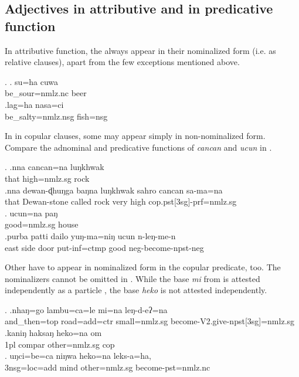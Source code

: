 	
\subsection{Adjectives in attributive and in predicative function}\label{sec-adj-str}

In attributive function, the  always appear in their nominalized form (i.e. as relative clauses), apart from  the few exceptions mentioned above. 

\ex. \ag. su=ha cuwa\\
	be\_sour{\sc =nmlz.nc} beer\\
\bg.lag=ha nasa=ci\\
		be\_salty{\sc =nmlz.nsg} fish{\sc =nsg}	\\
	
In  in copular clauses, some  may appear simply in non-nominalized  form. Compare the adnominal and predicative functions of \emph{cancan}  and  \emph{ucun}  in \Next. 

\ex. \ag.nna   cancan=na luŋkhwak\\
		that high{\sc =nmlz.sg} rock	\\
	 
 	\bg.nna  dewan-ɖhuŋga baŋna luŋkhwak sahro cancan sa-ma=na\\
	that Dewan-stone called rock very high {\sc cop.pst[3sg]-prf=nmlz.sg}	\\
	 
\bg. ucun=na paŋ\\ 
	good{\sc =nmlz.sg} house\\ 
	 \bg.purba patti dailo yuŋ-ma=niŋ  ucun n-leŋ-me-n\\
	east side door put-{\sc inf=ctmp} good {\sc neg-}become{\sc [3sg]-npst-neg}\\
	 
	
Other  have to appear in nominalized form in the copular predicate, too. The nominalizers  cannot  be omitted in \Next. While the base \emph{mi} from \Next[a] is attested independently as a  particle , the base \emph{heko} is not attested independently.

	\ex. \ag.nhaŋ=go        lambu=ca=le                 mi=na  leŋ-d-eʔ=na\\
	and\_then{\sc =top} road{\sc =add=ctr} small{\sc =nmlz.sg}  become{\sc -V2.give-npst[3sg]=nmlz.sg}\\
	 
	\bg.kaniŋ haksaŋ   heko=na         om\\
	{\sc 1pl} {\sc compar} other{\sc =nmlz.sg} {\sc cop}\\
	 
\bg.  uŋci=be=ca           niŋwa heko=na         leks-a=ha,\\
{\sc 3nsg=loc=add} mind other{\sc =nmlz.sg} become{\sc [3sg]-pst=nmlz.nc}\\
 

